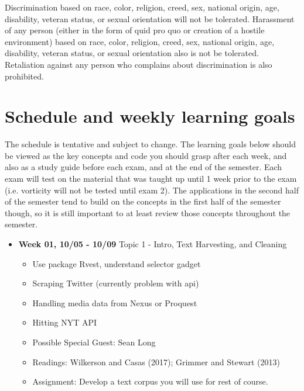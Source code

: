 \documentclass[11pt]{article}
\begin{document}
\footnotesize{Discrimination based on race, color, religion, creed, sex, national origin, age, disability, veteran status, or sexual orientation will not be tolerated. Harassment of any person (either in the form of quid pro quo or creation of a hostile environment) based on race, color, religion, creed, sex, national origin, age, disability, veteran status, or sexual orientation also is not be tolerated. Retaliation against any person who complains about discrimination is also prohibited.}


\newpage
\section*{Schedule and weekly learning goals}

The schedule is tentative and subject to change. The learning goals below should be viewed as the key concepts and code you should grasp after each week, and also as a study guide before each exam, and at the end of the semester. Each exam will test on the material that was taught up until 1 week prior to the exam (i.e. vorticity will not be tested until exam 2). The applications in the second half of the semester tend to build on the concepts in the first half of the semester though, so it is still important to at least review those concepts throughout the semester.



\begin{itemize}
	\item \textbf{Week 01, 10/05 - 10/09} Topic 1 - Intro, Text Harvesting, and Cleaning
	\begin{itemize}
	\item Use package Rvest, understand selector gadget
	\item Scraping Twitter (currently problem with api)
	\item Handling media data from Nexus or Proquest
	\item Hitting NYT API
	\item Possible Special Guest: Sean Long
	\item Readings: Wilkerson and Casas (2017); Grimmer and Stewart (2013)
	\item Assignment: Develop a text corpus you will use for rest of course.
	\end{itemize}
\end{itemize}
\end{document}
